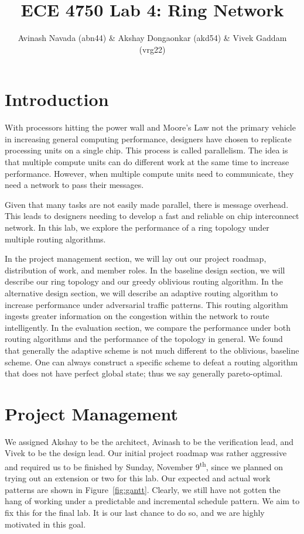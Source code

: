 \documentclass[10pt]{article}
\begin{document}
\title{ECE 4750 Lab 4: Ring Network}
\author{Avinash Navada (abn44) \& Akshay Dongaonkar (akd54) 
		\& Vivek Gaddam (vrg22)}
\maketitle


\section{Introduction}

With processors hitting the power wall and Moore's Law not the primary vehicle
in increasing general computing performance, designers have chosen to
replicate processing units on a single chip. 
This process is called parallelism. 
The idea is that multiple compute units can do different work at the same time
to increase performance.
However, when multiple compute units need to communicate, they need a network
to pass their messages. \par

Given that many tasks are not easily made parallel, there is message overhead.
This leads to designers needing to develop a fast and reliable
on chip interconnect network.
In this lab, we explore the performance of a ring topology under multiple
routing algorithms. \par

In the project management section, we will lay out our project roadmap,
distribution of work, and member roles.
In the baseline design section, we will describe our ring topology and our 
greedy oblivious routing algorithm.
In the alternative design section, we will describe an adaptive routing 
algorithm to increase performance under adversarial traffic patterns.
This routing algorithm ingests greater information on the congestion within
the network to route intelligently.
In the evaluation section, we compare the performance under both routing
algorithms and the performance of the topology in general. 
We found that generally the adaptive scheme is not much different to the 
oblivious, baseline scheme. 
One can always construct a specific scheme to defeat a routing algorithm that
does not have perfect global state; thus we say generally pareto-optimal.


\section{Project Management}

We assigned Akshay to be the architect,
Avinash to be the verification lead,
and Vivek to be the design lead.
Our initial project roadmap was rather aggressive and required us to be 
finished by Sunday, November 9\textsuperscript{th}, since we planned on 
trying out an extension or two for this lab. 
Our expected and actual work patterns are shown in Figure~\ref{fig:gantt}.
Clearly, we still have not gotten the hang of working under a predictable
and incremental schedule pattern.
We aim to fix this for the final lab.
It is our last chance to do so, and we are highly motivated in this goal.
 \par
\end{document}
